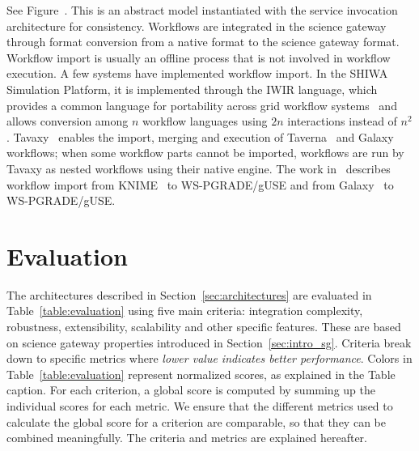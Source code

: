 \documentclass[preprint,3p,twocolumn]{elsarticle}
\begin{document}
See Figure~. This is an abstract model
instantiated with the service invocation architecture for
consistency. Workflows are integrated in the science gateway through
format conversion from a native format to the science gateway
format. Workflow import is usually an offline process that is not
involved in workflow execution. A few systems have implemented
workflow import. In the SHIWA Simulation Platform, it is implemented
through the IWIR language, which provides a common language for
portability across grid workflow
systems~\cite{plankensteiner-prodan-etal:2013} and allows conversion
among $n$ workflow languages using $2n$ interactions instead of $n^2$.
Tavaxy~\cite{Abouelhoda2012}
enables the import, merging and execution of Taverna~\cite{oinn2004taverna} and
Galaxy~\cite{goecks2010galaxy} workflows; when some workflow parts
cannot be imported, workflows are run by Tavaxy as nested workflows
using their native engine. The work in~\cite{delaGarza2016} describes
workflow import from KNIME~\cite{Berthold2008} to WS-PGRADE/gUSE and
from Galaxy~\cite{goecks2010galaxy} to WS-PGRADE/gUSE.


\section{Evaluation}

\label{sec:evaluation}

The architectures described in Section~\ref{sec:architectures} are
evaluated in Table~\ref{table:evaluation} using five main criteria:
integration complexity, robustness, extensibility, scalability and
other specific features. These are based on science gateway properties
introduced in Section~\ref{sec:intro_sg}. Criteria break down to
specific metrics where \emph{lower value indicates better
  performance}. Colors in Table~\ref{table:evaluation} represent
normalized scores, as explained in the Table caption. For each
criterion, a global score is computed by summing up the individual
scores for each metric. We ensure that the different metrics used to
calculate the global score for a criterion are comparable, so that
they can be combined meaningfully. The criteria and metrics are
explained hereafter.
\end{document}
